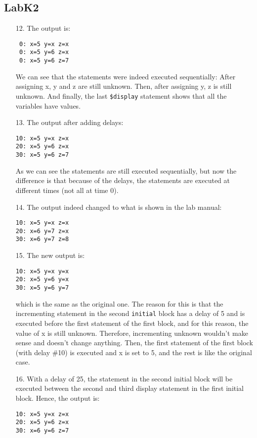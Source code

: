 \documentclass{article}
\begin{document}
\subsection{LabK2}
\begin{enumerate}
\item[12. ] The output is:
    \begin{verbatim}
 0: x=5 y=x z=x
 0: x=5 y=6 z=x
 0: x=5 y=6 z=7
    \end{verbatim}
    We can see that the statements were indeed executed sequentially: \linebreak
    After assigning x, y and z are still unknown. Then, after assigning y, z is still unknown. And finally, the last \verb#$display# statement shows that all the variables have values. 

\item[13. ] The output after adding delays:
    \begin{verbatim}
10: x=5 y=x z=x
20: x=5 y=6 z=x
30: x=5 y=6 z=7
    \end{verbatim}
    As we can see the statements are still executed sequentially, but now the difference is that because of the delays, the statements are executed at different times (not all at time 0).

\item[14. ] The output indeed changed to what is shown in the lab manual:
    \begin{verbatim}
10: x=5 y=x z=x
20: x=6 y=7 z=x
30: x=6 y=7 z=8
    \end{verbatim}

\item[15. ] The new output is:
    \begin{verbatim}
10: x=5 y=x y=x
20: x=5 y=6 y=x
30: x=5 y=6 y=7
    \end{verbatim}
    which is the same as the original one. The reason for this is that the incrementing statement in the second \verb$initial$ block has a delay of 5 and is executed before the first statement of the first block, and for this reason, the value of x is still unknown. Therefore, incrementing unknown wouldn't make sense and doesn't change anything. Then, the first statement of the first block (with delay \#10) is executed and x is set to 5, and the rest is like the original case.

\item[16. ] With a delay of 25, the statement in the second initial block will be executed between the second and third display statement in the first initial block. Hence, the output is:
    \begin{verbatim}
10: x=5 y=x z=x
20: x=5 y=6 z=x
30: x=6 y=6 z=7
    \end{verbatim}


\end{enumerate}
\end{document}
